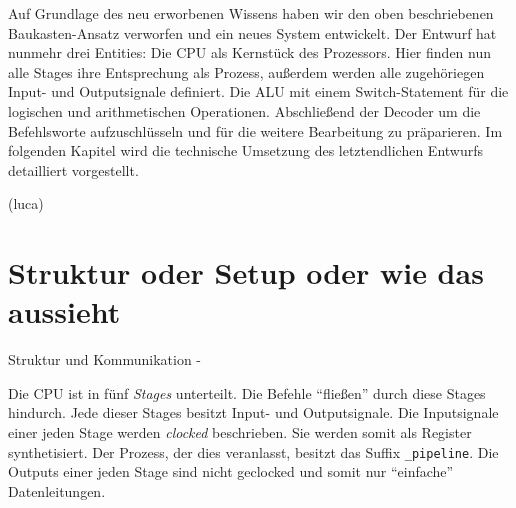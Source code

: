 \documentclass[paper=a4,fontsize=12pt,twocolumn]{scrreprt}
\begin{document}
Auf Grundlage des neu erworbenen Wissens haben wir den oben beschriebenen Baukasten-Ansatz verworfen und ein neues System entwickelt. 
Der Entwurf hat nunmehr drei Entities: Die CPU als Kernstück des Prozessors.
Hier finden nun alle Stages ihre Entsprechung als Prozess, außerdem werden alle zugehöriegen Input- und Outputsignale definiert.
Die ALU mit einem Switch-Statement für die logischen und arithmetischen Operationen.
Abschließend der Decoder um die Befehlsworte aufzuschlüsseln und für die weitere Bearbeitung zu präparieren.
Im folgenden Kapitel wird die technische Umsetzung des letztendlichen Entwurfs detailliert vorgestellt.

(luca)
\section{Struktur oder Setup oder wie das aussieht}
Struktur und Kommunikation -


Die CPU ist in fünf \textit{Stages} unterteilt.
Die Befehle \enquote{fließen} durch diese Stages hindurch.
Jede dieser Stages besitzt Input- und Outputsignale.
Die Inputsignale einer jeden Stage werden \textit{clocked} beschrieben.
Sie werden somit als Register synthetisiert.
Der Prozess, der dies veranlasst, besitzt das Suffix \texttt{\_pipeline}.
Die Outputs einer jeden Stage sind nicht geclocked und somit nur \enquote{einfache} Datenleitungen.
\end{document}
